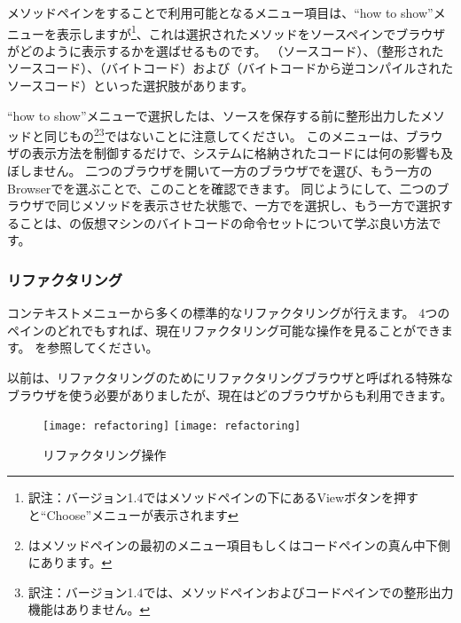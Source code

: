 \documentclass[a4paper,10pt,twoside]{book}
\begin{document}
メソッドペインを\actclick することで利用可能となるメニュー項目は、``how to show''メニューを表示しますが\footnote{訳注：バージョン1.4ではメソッドペインの下にあるViewボタンを押すと``Choose''メニューが表示されます}、これは選択されたメソッドをソースペインでブラウザがどのように表示するかを選ばせるものです。 （ソースコード）、（整形されたソースコード）、（バイトコード）および（バイトコードから逆コンパイルされたソースコード）といった選択肢があります。

``how to show''メニューで選択したは、ソースを保存する前に整形出力したメソッドと同じもの\footnote{はメソッドペインの最初のメニュー項目もしくはコードペインの真ん中下側にあります。}\footnote{訳注：バージョン1.4では、メソッドペインおよびコードペインでの整形出力機能はありません。}ではないことに注意してください。
このメニューは、ブラウザの表示方法を制御するだけで、システムに格納されたコードには何の影響も及ぼしません。
二つのブラウザを開いて一方のブラウザでを選び、もう一方のBrowserでを選ぶことで、このことを確認できます。
同じようにして、二つのブラウザで同じメソッドを表示させた状態で、一方でを選択し、もう一方で選択することは、\pharo の仮想マシンのバイトコードの命令セットについて学ぶ良い方法です。

\subsubsection{リファクタリング}

コンテキストメニューから多くの標準的なリファクタリングが行えます。
4つのペインのどれでも\actclick すれば、現在リファクタリング可能な操作を見ることができます。
を参照してください。

以前は、リファクタリングのためにリファクタリングブラウザと呼ばれる特殊なブラウザを使う必要がありましたが、現在はどのブラウザからも利用できます。

\begin{figure}[btp]
\begin{center}
\ifluluelse
{\texttt{[image: refactoring]}}
{\texttt{[image: refactoring]}}
\end{center}
\caption{リファクタリング操作}
\end{figure}
\end{document}
